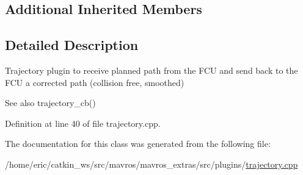 \subsection*{Additional Inherited Members}


\subsection{Detailed Description}
Trajectory plugin to receive planned path from the F\+CU and send back to the F\+CU a corrected path (collision free, smoothed) 

\begin{DoxySeeAlso}{See also}
trajectory\+\_\+cb() 
\end{DoxySeeAlso}


Definition at line 40 of file trajectory.\+cpp.



The documentation for this class was generated from the following file\+:\begin{DoxyCompactItemize}
\item 
/home/eric/catkin\+\_\+ws/src/mavros/mavros\+\_\+extras/src/plugins/\mbox{\hyperlink{trajectory_8cpp}{trajectory.\+cpp}}\end{DoxyCompactItemize}
